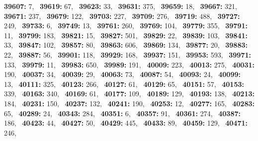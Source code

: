 \textbf{39607:} 7,\allowbreak~ 
\textbf{39619:} 67,\allowbreak~ 
\textbf{39623:} 33,\allowbreak~ 
\textbf{39631:} 375,\allowbreak~ 
\textbf{39659:} 18,\allowbreak~ 
\textbf{39667:} 321,\allowbreak~ 
\textbf{39671:} 237,\allowbreak~ 
\textbf{39679:} 122,\allowbreak~ 
\textbf{39703:} 227,\allowbreak~ 
\textbf{39709:} 276,\allowbreak~ 
\textbf{39719:} 488,\allowbreak~ 
\textbf{39727:} 249,\allowbreak~ 
\textbf{39733:} 6,\allowbreak~ 
\textbf{39749:} 13,\allowbreak~ 
\textbf{39761:} 260,\allowbreak~ 
\textbf{39769:} 104,\allowbreak~ 
\textbf{39779:} 355,\allowbreak~ 
\textbf{39791:} 11,\allowbreak~ 
\textbf{39799:} 183,\allowbreak~ 
\textbf{39821:} 15,\allowbreak~ 
\textbf{39827:} 501,\allowbreak~ 
\textbf{39829:} 22,\allowbreak~ 
\textbf{39839:} 103,\allowbreak~ 
\textbf{39841:} 33,\allowbreak~ 
\textbf{39847:} 102,\allowbreak~ 
\textbf{39857:} 80,\allowbreak~ 
\textbf{39863:} 606,\allowbreak~ 
\textbf{39869:} 134,\allowbreak~ 
\textbf{39877:} 20,\allowbreak~ 
\textbf{39883:} 22,\allowbreak~ 
\textbf{39887:} 56,\allowbreak~ 
\textbf{39901:} 118,\allowbreak~ 
\textbf{39929:} 168,\allowbreak~ 
\textbf{39937:} 151,\allowbreak~ 
\textbf{39953:} 593,\allowbreak~ 
\textbf{39971:} 133,\allowbreak~ 
\textbf{39979:} 11,\allowbreak~ 
\textbf{39983:} 650,\allowbreak~ 
\textbf{39989:} 191,\allowbreak~ 
\textbf{40009:} 223,\allowbreak~ 
\textbf{40013:} 275,\allowbreak~ 
\textbf{40031:} 190,\allowbreak~ 
\textbf{40037:} 34,\allowbreak~ 
\textbf{40039:} 29,\allowbreak~ 
\textbf{40063:} 73,\allowbreak~ 
\textbf{40087:} 54,\allowbreak~ 
\textbf{40093:} 24,\allowbreak~ 
\textbf{40099:} 13,\allowbreak~ 
\textbf{40111:} 325,\allowbreak~ 
\textbf{40123:} 266,\allowbreak~ 
\textbf{40127:} 61,\allowbreak~ 
\textbf{40129:} 65,\allowbreak~ 
\textbf{40151:} 57,\allowbreak~ 
\textbf{40153:} 339,\allowbreak~ 
\textbf{40163:} 340,\allowbreak~ 
\textbf{40169:} 61,\allowbreak~ 
\textbf{40177:} 109,\allowbreak~ 
\textbf{40189:} 129,\allowbreak~ 
\textbf{40193:} 138,\allowbreak~ 
\textbf{40213:} 184,\allowbreak~ 
\textbf{40231:} 150,\allowbreak~ 
\textbf{40237:} 132,\allowbreak~ 
\textbf{40241:} 190,\allowbreak~ 
\textbf{40253:} 12,\allowbreak~ 
\textbf{40277:} 165,\allowbreak~ 
\textbf{40283:} 65,\allowbreak~ 
\textbf{40289:} 24,\allowbreak~ 
\textbf{40343:} 284,\allowbreak~ 
\textbf{40351:} 6,\allowbreak~ 
\textbf{40357:} 91,\allowbreak~ 
\textbf{40361:} 274,\allowbreak~ 
\textbf{40387:} 186,\allowbreak~ 
\textbf{40423:} 44,\allowbreak~ 
\textbf{40427:} 50,\allowbreak~ 
\textbf{40429:} 445,\allowbreak~ 
\textbf{40433:} 89,\allowbreak~ 
\textbf{40459:} 129,\allowbreak~ 
\textbf{40471:} 246,\allowbreak~ 
